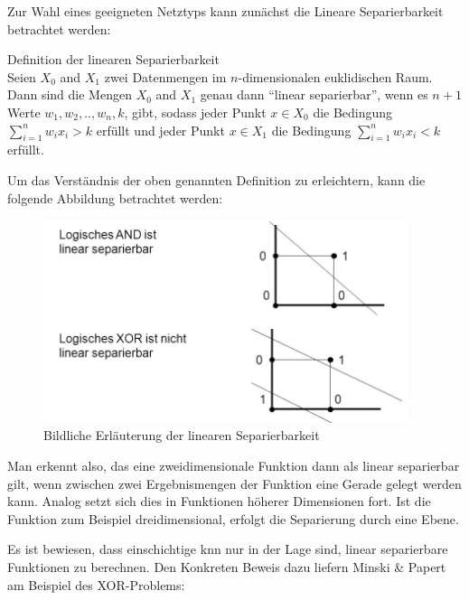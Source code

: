 Zur Wahl eines geeigneten Netztyps kann zunächst die Lineare Separierbarkeit betrachtet werden:

\begin{defi}Definition der linearen Separierbarkeit\\
Seien $X_{0}$ and $X_{1}$ zwei Datenmengen im $n$-dimensionalen euklidischen Raum. Dann sind die Mengen $X_{0}$ and $X_{1}$ genau dann  "`linear separierbar"', wenn es  $n+1$ Werte $w_{1}, w_{2},..,w_{n}, k$, gibt, sodass jeder Punkt  $x \in X_{0}$ die Bedingung $\sum^{n}_{i=1} w_{i}x_{i} > k$ erfüllt und jeder Punkt $x \in X_{1}$ die Bedingung $\sum^{n}_{i=1} w_{i}x_{i} < k$ erfüllt.
\end{defi}

Um das Verständnis der oben genannten Definition zu erleichtern, kann die folgende Abbildung betrachtet werden:

\begin{figure}[H]
\centering
		\includegraphics[width=0.95\textwidth]{Linear_Sep.png}
	\caption{Bildliche Erläuterung der linearen Separierbarkeit}
	\label{fig:Bildliche Erläuterung der linearen Separierbarkeit}
\end{figure}

Man erkennt also, das eine zweidimensionale Funktion dann als linear separierbar gilt, wenn zwischen zwei Ergebnismengen der Funktion eine Gerade gelegt werden kann. Analog setzt sich dies in Funktionen höherer Dimensionen fort. Ist die Funktion zum Beispiel dreidimensional, erfolgt die Separierung durch eine Ebene.

Es ist bewiesen, dass einschichtige \acs{knn} nur in der Lage sind, linear separierbare Funktionen zu berechnen. Den Konkreten Beweis dazu liefern Minski \& Papert am Beispiel des XOR-Problems:

